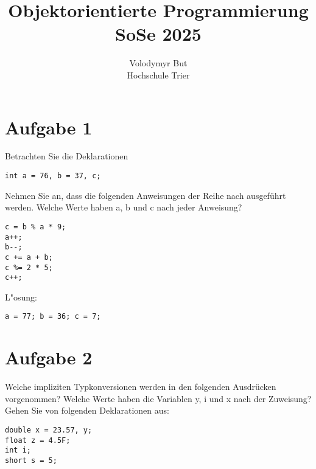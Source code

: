 \documentclass[10pt, oneside]{article}
\title{Objektorientierte Programmierung\\[10pt]\Large{SoSe 2025}}
\author{Volodymyr But\\[10pt]Hochschule Trier}
\date{}
\begin{document}
\maketitle
\vspace{25px}

\section{Aufgabe 1}

Betrachten Sie die Deklarationen

\begin{verbatim}
int a = 76, b = 37, c;
\end{verbatim}

Nehmen Sie an, dass die folgenden Anweisungen der Reihe nach ausgeführt werden.
Welche Werte haben a, b und c nach jeder Anweisung?

\begin{verbatim}
c = b % a * 9;
a++;
b--;
c += a + b;
c %= 2 * 5;
c++;
\end{verbatim}

L"osung:

\begin{verbatim}
a = 77; b = 36; c = 7;
\end{verbatim}

\section{Aufgabe 2}

Welche impliziten Typkonversionen werden in den folgenden Ausdrücken
vorgenommen? Welche Werte haben die Variablen y, i und x nach der Zuweisung?
Gehen Sie von folgenden Deklarationen aus:

\begin{verbatim}
double x = 23.57, y;
float z = 4.5F;
int i;
short s = 5;
\end{verbatim}
\end{document}
